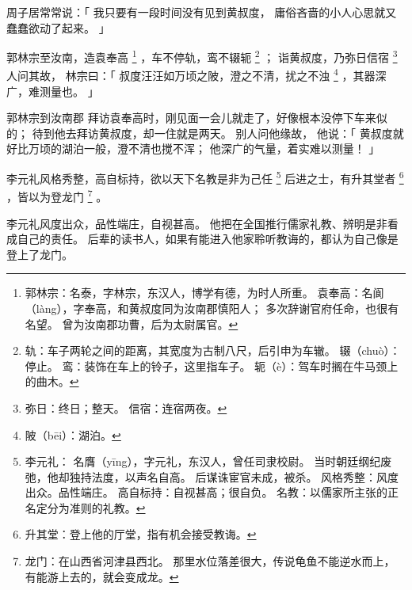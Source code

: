 \begin{paracol}{2}
\switchcolumn

周子居常常说：「
    我只要有一段时间没有见到黄叔度，
    庸俗吝啬的小人心思就又蠢蠢欲动了起来。
」


\switchcolumn*[\section{}]

郭林宗至汝南，造袁奉高%
\footnote{%
    郭林宗：名泰，字林宗，东汉人，博学有德，为时人所重。
    袁奉高：名阆（làng），字奉高，和黄叔度同为汝南郡慎阳人；
            多次辞谢官府任命，也很有名望。
            曾为汝南郡功曹，后为太尉属官。
}%
，车不停轨，鸾不辍轭%
\footnote{%
    轨：车子两轮之间的距离，其宽度为古制八尺，后引申为车辙。
    辍（chuò）：停止。
    鸾：装饰在车上的铃子，这里指车子。
    轭（è）：驾车时搁在牛马颈上的曲木。
}%
；
诣黄叔度，乃弥日信宿%
\footnote{%
    弥日：终日；整天。
    信宿：连宿两夜。
}%
人问其故，
林宗曰：「
    叔度汪汪如万顷之陂，澄之不清，扰之不浊%
    \footnote{%
        陂（bēi）：湖泊。
    }%
    ，其器深广，难测量也。
」

\switchcolumn

郭林宗到汝南郡
拜访袁奉高时，刚见面一会儿就走了，好像根本没停下车来似的；
待到他去拜访黄叔度，却一住就是两天。
别人问他缘故，
他说：「
    黄叔度就好比万顷的湖泊一般，澄不清也搅不浑；
    他深广的气量，着实难以测量！
」


\switchcolumn*[\section{}]

李元礼风格秀整，高自标持，欲以天下名教是非为己任%
\footnote{%
    李元礼：
            名膺（yīng），字元礼，东汉人，曾任司隶校尉。
            当时朝廷纲纪废弛，他却独持法度，以声名自高。
            后谋诛宦官未成，被杀。
    风格秀整：风度出众。品性端庄。
    高自标持：自视甚高；很自负。
    名教：以儒家所主张的正名定分为准则的礼教。
}%
后进之士，有升其堂者%
\footnote{%
    升其堂：登上他的厅堂，指有机会接受教诲。
}%
，皆以为登龙门%
\footnote{%
    龙门：在山西省河津县西北。
          那里水位落差很大，传说龟鱼不能逆水而上，
          有能游上去的，就会变成龙。
}%
。

\switchcolumn

李元礼风度出众，品性端庄，自视甚高。
他把在全国推行儒家礼教、辨明是非看成自己的责任。
后辈的读书人，如果有能进入他家聆听教诲的，都认为自己像是登上了龙门。



\end{paracol}
